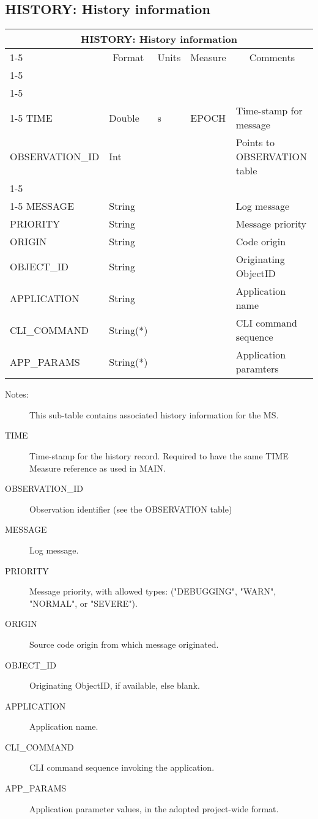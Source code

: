 \documentclass{article}
\newcommand{\defline}[1]{\cline{1-5}
\multicolumn{5}{|l|}{#1} \\
\cline{1-5}}
\newcommand{\definetable}[2]
{
	\vfill\newpage
	\subsection{#1}
        \vspace{0.15in}
        \small
	\begin{tabular}{|l|p{1.25in}|l|p{.9in}|p{1.4in}|}
	\hline
	\multicolumn{5}{|c|}{\bf #1}\\ 
	\cline{1-5}
        \multicolumn{1}{|c|}{Name}&\multicolumn{1}{|c|}{Format}&
        \multicolumn{1}{|c|}{Units}&\multicolumn{1}{|c|}{Measure}&
        \multicolumn{1}{|c|}{Comments}\\
        \cline{1-5}
        #2
        \hline
	\end{tabular}
}
\begin{document}
\definetable{HISTORY: History information}{
\defline{\bf Columns}
\defline{\em Key}
TIME & Double & s &              EPOCH  & Time-stamp for message\\
OBSERVATION\_ID  & Int   &          &        & Points to OBSERVATION table\\
\defline{\em Data}  
MESSAGE  & String &    &      & Log message\\
PRIORITY & String & & & Message priority\\
ORIGIN   & String & & & Code origin\\
OBJECT\_ID & String & & & Originating ObjectID \\
APPLICATION & String & & & Application name\\
CLI\_COMMAND & String(*) & & & CLI command sequence \\
APP\_PARAMS   & String(*) & & & Application paramters\\
}
\begin{description}

\item[Notes:] This sub-table contains associated history information
for the MS.

\item[TIME] Time-stamp for the history record. Required to have the
same TIME Measure reference as used in MAIN.

\item[OBSERVATION\_ID] Observation identifier (see the OBSERVATION table)

\item[MESSAGE] Log message.

\item[PRIORITY] Message priority, with allowed types: ("DEBUGGING",
"WARN", "NORMAL", or "SEVERE").

\item[ORIGIN] Source code origin from which message originated.

\item[OBJECT\_ID] Originating ObjectID, if available, else blank.

\item[APPLICATION] Application name.

\item[CLI\_COMMAND] CLI command sequence invoking the application.

\item[APP\_PARAMS] Application parameter values, in the adopted
project-wide format.
\end{description}
\end{document}
